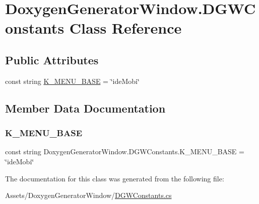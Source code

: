 \hypertarget{class_doxygen_generator_window_1_1_d_g_w_constants}{}\section{Doxygen\+Generator\+Window.\+D\+G\+W\+Constants Class Reference}
\label{class_doxygen_generator_window_1_1_d_g_w_constants}
\subsection*{Public Attributes}
\begin{DoxyCompactItemize}
\item 
const string \hyperlink{class_doxygen_generator_window_1_1_d_g_w_constants_a7a31e845f1ad6df15d15c82ea1c75d56}{K\+\_\+\+M\+E\+N\+U\+\_\+\+B\+A\+SE} = \char`\"{}ide\+Mobi\char`\"{}
\end{DoxyCompactItemize}


\subsection{Member Data Documentation}
\mbox{\label{class_doxygen_generator_window_1_1_d_g_w_constants_a7a31e845f1ad6df15d15c82ea1c75d56}} 
\subsubsection{\texorpdfstring{K\+\_\+\+M\+E\+N\+U\+\_\+\+B\+A\+SE}{K\_MENU\_BASE}}
{\footnotesize\ttfamily const string Doxygen\+Generator\+Window.\+D\+G\+W\+Constants.\+K\+\_\+\+M\+E\+N\+U\+\_\+\+B\+A\+SE = \char`\"{}ide\+Mobi\char`\"{}}



The documentation for this class was generated from the following file\+:\begin{DoxyCompactItemize}
\item 
Assets/\+Doxygen\+Generator\+Window/\hyperlink{_d_g_w_constants_8cs}{D\+G\+W\+Constants.\+cs}\end{DoxyCompactItemize}
